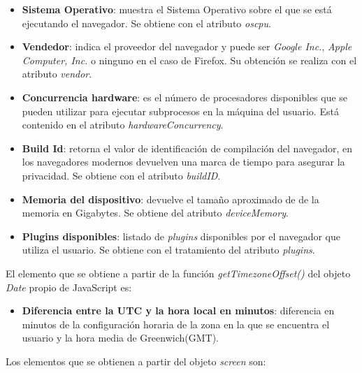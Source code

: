 \begin{itemize}
    \item \textbf{Sistema Operativo}: muestra el Sistema Operativo sobre el que se está ejecutando el navegador. Se obtiene con el atributo \textit{oscpu}.
    \item \textbf{Vendedor}: indica el proveedor del navegador y puede ser \textit{Google Inc.}, \textit{Apple Computer, Inc.} o ninguno en el caso de Firefox. Su obtención se realiza con el atributo \textit{vendor}.
    \item \textbf{Concurrencia hardware}: es el número de procesadores disponibles que se pueden utilizar para ejecutar subprocesos en la máquina del usuario. Está contenido en el atributo \textit{hardwareConcurrency}.
    \item \textbf{Build Id}: retorna el valor de identificación de compilación del navegador, en los navegadores modernos devuelven una marca de tiempo para asegurar la privacidad. Se obtiene con el atributo \textit{buildID}.
    \item \textbf{Memoria del dispositivo}: devuelve el tamaño aproximado de de la memoria en Gigabytes. Se obtiene del atributo \textit{deviceMemory}.
     \item \textbf{Plugins disponibles}: listado de \textit{plugins} disponibles por el navegador que utiliza el usuario. Se obtiene con el tratamiento del atributo \textit{plugins}.
\end{itemize}
\noindent El elemento que se obtiene a partir de la función \textit{getTimezoneOffset()} del objeto \textit{Date} propio de JavaScript es:
\begin{itemize} 
    \item \textbf{Diferencia entre la UTC y la hora local en minutos}: diferencia en minutos de la configuración horaria de la zona en la que se encuentra el usuario y la hora media de Greenwich(GMT).
\end{itemize}
\noindent  Los elementos que se obtienen a partir del objeto \textit{screen} son:
